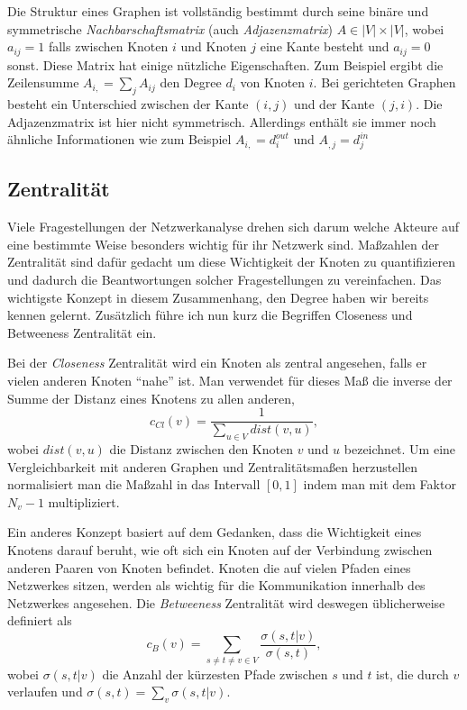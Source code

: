 \documentclass[a4paper,ngerman,oneside,titlepage,bibliography=totoc,11pt]{scrreprt}
\begin{document}
Die Struktur eines Graphen ist vollständig bestimmt durch seine binäre und symmetrische\emph{ Nachbarschaftsmatrix} (auch \emph{Adjazenzmatrix}) $A \in |V| \times |V|$, wobei $a_{ij} = 1$ falls zwischen Knoten $i$ und Knoten $j$ eine Kante besteht und $a_{ij} = 0$ sonst. Diese Matrix hat einige nützliche Eigenschaften. Zum Beispiel ergibt die Zeilensumme $A_{i,} = \sum_j{A_{ij}}$ den Degree $d_i$ von Knoten $i$.  
Bei gerichteten Graphen besteht ein Unterschied zwischen der Kante $(i,j)$ und der Kante $(j,i)$. Die Adjazenzmatrix ist hier nicht symmetrisch. Allerdings enthält sie immer noch ähnliche Informationen wie zum Beispiel $A_{i,} = d_i^{out}$ und $A_{,j} = d_j^{in}$

\subsection{Zentralität}
Viele Fragestellungen der Netzwerkanalyse drehen sich darum welche Akteure auf eine bestimmte Weise besonders wichtig für ihr Netzwerk sind. Maßzahlen der Zentralität sind dafür gedacht um diese Wichtigkeit der Knoten zu quantifizieren und dadurch die Beantwortungen solcher Fragestellungen zu vereinfachen. Das wichtigste Konzept in diesem Zusammenhang, den Degree haben wir bereits kennen gelernt. Zusätzlich führe ich nun kurz die Begriffen Closeness und Betweeness Zentralität ein.

Bei der \emph{Closeness} Zentralität wird ein Knoten als zentral angesehen, falls er vielen anderen Knoten "`nahe"' ist.
Man verwendet für dieses Maß die inverse der Summe der Distanz eines Knotens zu allen anderen,
$$ c_{Cl}(v)=\frac{1}{\sum_{u \in V}{dist(v,u)}}, $$
wobei $dist(v,u)$ die Distanz zwischen den Knoten $v$ und $u$ bezeichnet. Um eine Vergleichbarkeit mit anderen Graphen und Zentralitätsmaßen herzustellen normalisiert man die Maßzahl in das Intervall $[0,1]$ indem man mit dem Faktor $N_v - 1$ multipliziert.

Ein anderes Konzept basiert auf dem Gedanken, dass die Wichtigkeit eines Knotens darauf beruht, wie oft sich ein Knoten auf der Verbindung zwischen anderen Paaren von Knoten befindet. Knoten die auf vielen Pfaden eines Netzwerkes sitzen, werden als wichtig für die Kommunikation innerhalb des Netzwerkes angesehen. 
Die \emph{Betweeness} Zentralität wird deswegen üblicherweise definiert als
$$ c_{B}(v)= \sum_{s \neq t \neq v \in V} {\frac{\sigma(s,t|v)}{\sigma(s,t)}}, $$
wobei $\sigma(s,t|v)$ die Anzahl der kürzesten Pfade zwischen $s$ und $t$ ist, die durch $v$ verlaufen und $\sigma(s,t) = \sum_v{\sigma(s,t|v)}$.
\end{document}
